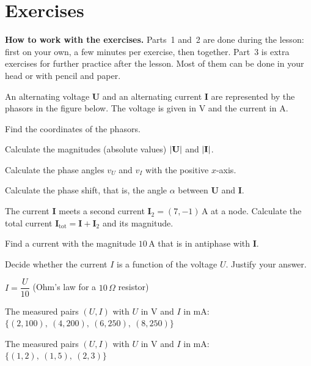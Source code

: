 
\section{Exercises}
\label{c8:sec:uppgifter}

\begin{aside}
\textbf{How to work with the exercises.} Parts~1 and~2 are done during the lesson: first on your
own, a few minutes per exercise, then together. Part~3 is extra exercises for further practice
after the lesson. Most of them can be done in your head or with pencil and paper.

\end{aside}


An alternating voltage $\mathbf{U}$ and an alternating current $\mathbf{I}$ are represented by the
phasors in the figure below. The voltage is given in V and the current in A.
\begin{parts}
  \item Find the coordinates of the phasors.
  \item Calculate the magnitudes (absolute values) $\lvert\mathbf{U}\rvert$ and $\lvert\mathbf{I}\rvert$.
  \item Calculate the phase angles $v_U$ and $v_I$ with the positive $x$-axis.
  \item Calculate the phase shift, that is, the angle $\alpha$ between $\mathbf{U}$ and
    $\mathbf{I}$.
  \item The current $\mathbf{I}$ meets a second current $\mathbf{I}_2 = (7, -1)\,\text{A}$ at a
    node. Calculate the total current $\mathbf{I}_{\text{tot}} = \mathbf{I} + \mathbf{I}_2$ and its
    magnitude.
  \item Find a current with the magnitude $10\,\text{A}$ that is in antiphase with $\mathbf{I}$.
\end{parts}


Decide whether the current $I$ is a function of the voltage $U$. Justify your answer.
\begin{parts}
  \item $I = \dfrac{U}{10}$ (Ohm's law for a $10\,\Omega$ resistor)
  \item The measured pairs $(U, I)$ with $U$ in V and $I$ in mA: $\lbrace(2, 100),\ (4, 200),\ (6,
    250),\ (8, 250)\rbrace$
  \item The measured pairs $(U, I)$ with $U$ in V and $I$ in mA: $\lbrace(1, 2),\ (1, 5),\ (2,
    3)\rbrace$
\end{parts}


